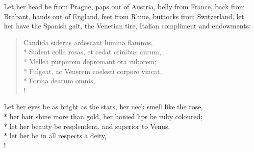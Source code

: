 Let her head be from Prague, paps out of Austria, belly from
France, back from Brabant, hands out of England, feet from Rhine,
buttocks from Switzerland, let her have the Spanish gait, the Venetian
tire, Italian compliment and endowments:
%
\begin{latin}
\begin{verse}%
Candida sideriis ardescant lumina flammis,\\*
Sudent colla rosas, et cedat crinibus aurum,\\*
Mellea purpurem depromant ora ruborem;\\*
Fulgeat, ac Venerem coelesti corpore vincat,\\*
Forma dearum omnis, \etc{}\\!
\end{verse}%
\end{latin}
\translationrule%
Let her eyes be as bright as the stars, her neck smell like the rose,\\*
her hair shine more than gold, her honied lips be ruby coloured;\\*
let her beauty be resplendent, and superior to Venus,\\*
let her be in all respects a deity, \etc{}\\!
%

